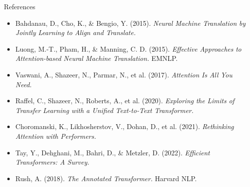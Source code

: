\begin{frame}{References}
\begin{flushleft}
\begin{itemize}
    \item[$\blacktriangleright$] Bahdanau, D., Cho, K., \& Bengio, Y. (2015). \textit{Neural Machine Translation by Jointly Learning to Align and Translate.}
    \item[$\blacktriangleright$] Luong, M.-T., Pham, H., \& Manning, C. D. (2015). \textit{Effective Approaches to Attention-based Neural Machine Translation.} EMNLP.
    \item[$\blacktriangleright$] Vaswani, A., Shazeer, N., Parmar, N., et al. (2017). \textit{Attention Is All You Need.}
    \item[$\blacktriangleright$] Raffel, C., Shazeer, N., Roberts, A., et al. (2020). \textit{Exploring the Limits of Transfer Learning with a Unified Text-to-Text Transformer.}
    \item[$\blacktriangleright$] Choromanski, K., Likhosherstov, V., Dohan, D., et al. (2021). \textit{Rethinking Attention with Performers.}
    \item[$\blacktriangleright$] Tay, Y., Dehghani, M., Bahri, D., \& Metzler, D. (2022). \textit{Efficient Transformers: A Survey.}
    \item[$\blacktriangleright$] Rush, A. (2018). \textit{The Annotated Transformer.} Harvard NLP.
\end{itemize}
\end{flushleft}
\end{frame}
